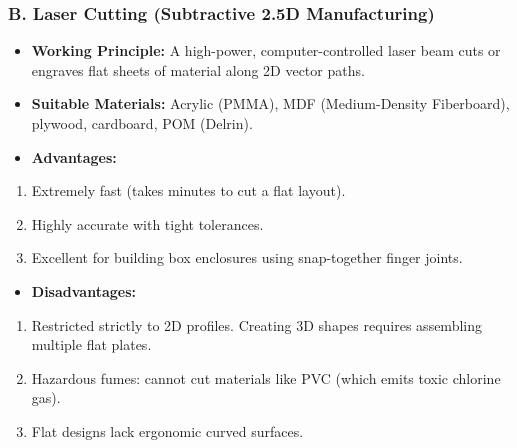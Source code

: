 \subsubsection{B. Laser Cutting (Subtractive 2.5D Manufacturing)}
\begin{itemize}
  \item   \textbf{Working Principle:} A high-power, computer-controlled laser beam cuts or engraves flat sheets of material along 2D vector paths.
  \item   \textbf{Suitable Materials:} Acrylic (PMMA), MDF (Medium-Density Fiberboard), plywood, cardboard, POM (Delrin).
  \item   \textbf{Advantages:}
\end{itemize}
\begin{enumerate}
  \item Extremely fast (takes minutes to cut a flat layout).
  \item Highly accurate with tight tolerances.
  \item Excellent for building box enclosures using snap-together finger joints.
\end{enumerate}
\begin{itemize}
  \item   \textbf{Disadvantages:}
\end{itemize}
\begin{enumerate}
  \item Restricted strictly to 2D profiles. Creating 3D shapes requires assembling multiple flat plates.
  \item Hazardous fumes: cannot cut materials like PVC (which emits toxic chlorine gas).
  \item Flat designs lack ergonomic curved surfaces.
\end{enumerate}

